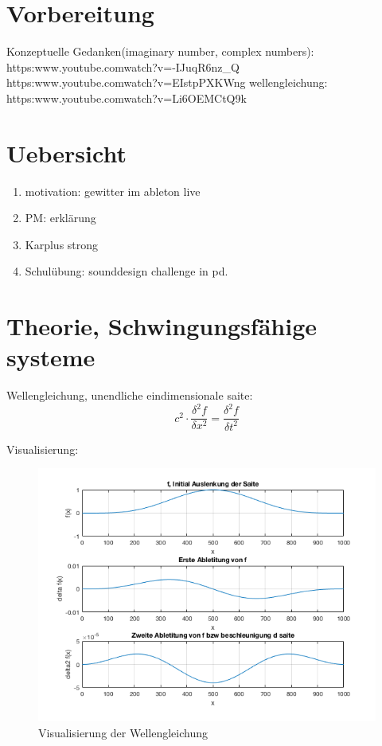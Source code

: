 \section{Vorbereitung}


Konzeptuelle Gedanken(imaginary number, complex numbers): \\
https:\/\/www.youtube.com\/watch?v=-IJuqR6nz\_Q \\
https:\/\/www.youtube.com\/watch?v=EIstpPXKWng
wellengleichung:\\
https:\/\/www.youtube.com\/watch?v=Li6OEMCtQ9k




\section{Uebersicht}


\begin{enumerate}
	\item motivation: gewitter im ableton live
	\item PM: erklärung
	\item Karplus strong
	\item Schulübung: sounddesign challenge in pd.

\end{enumerate}

\section{Theorie, Schwingungsfähige systeme}


Wellengleichung, unendliche eindimensionale saite:
\begin{equation}
	c^2 \cdot \frac{\delta^2 f}{\delta x^2} = \frac{\delta ^2 f}{\delta t ^2}
\end{equation}

Visualisierung:

\begin{figure}[H]
  \begin{center}
    \includegraphics[width = 14cm]{img/wellengleichungVis.png}
    \caption{Visualisierung der Wellengleichung}
    \label{fig:wellengleichung}
  \end{center}
\end{figure}




